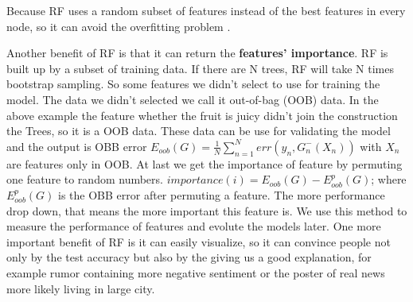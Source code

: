 Because RF uses a random subset of features instead of the best features in every node, so it can avoid the overfitting problem \cite{breiman2001random}. 

Another benefit of RF is that it can return the \textbf{features' importance}. RF is built up by a subset of training data. If there are N trees, RF will take N times bootstrap sampling. So some features we didn't select to use for training the model. The data we didn't selected we call it out-of-bag (OOB) data. In the above example the feature whether the fruit is juicy didn't join the construction the Trees, so it is a OOB data. These data can be use for validating the model and the output is OBB error $E_{oob}(G) = \frac {1}{N} \sum_{n=1}^{N}err(y_n,G_{n}^-(X_n))$ with $X_n$ are features only in OOB. At last we get the importance of feature by permuting one feature to random numbers. $importance(i)= E_{oob}(G)-E_{oob}^{p}(G)$; where $E_{oob}^{p}(G)$ is the OBB error after permuting a feature. The more performance drop down, that means the more important this feature is. We use this method to measure the performance of features and evolute the models later. 
One more important benefit of RF is it can easily visualize, so it can convince people not only by the test accuracy  but also by the giving us a good explanation, for example rumor containing more negative sentiment or the poster of real news more likely living in large city. 


